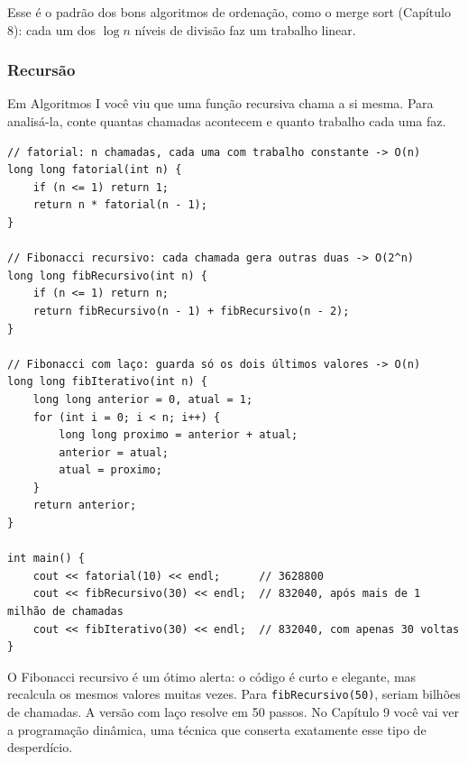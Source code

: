 Esse é o padrão dos bons algoritmos de ordenação, como o merge sort (Capítulo 8): cada um dos $\log n$ níveis de divisão faz um trabalho linear.

\subsubsection{Recursão}

Em Algoritmos I você viu que uma função recursiva chama a si mesma. Para analisá-la, conte quantas chamadas acontecem e quanto trabalho cada uma faz.

\begin{codigo}
\begin{Verbatim}[breaklines=true, breaksymbolleft={}, fontsize=\footnotesize]
// fatorial: n chamadas, cada uma com trabalho constante -> O(n)
long long fatorial(int n) {
    if (n <= 1) return 1;
    return n * fatorial(n - 1);
}

// Fibonacci recursivo: cada chamada gera outras duas -> O(2^n)
long long fibRecursivo(int n) {
    if (n <= 1) return n;
    return fibRecursivo(n - 1) + fibRecursivo(n - 2);
}

// Fibonacci com laço: guarda só os dois últimos valores -> O(n)
long long fibIterativo(int n) {
    long long anterior = 0, atual = 1;
    for (int i = 0; i < n; i++) {
        long long proximo = anterior + atual;
        anterior = atual;
        atual = proximo;
    }
    return anterior;
}

int main() {
    cout << fatorial(10) << endl;      // 3628800
    cout << fibRecursivo(30) << endl;  // 832040, após mais de 1 milhão de chamadas
    cout << fibIterativo(30) << endl;  // 832040, com apenas 30 voltas
}
\end{Verbatim}
\end{codigo}

O Fibonacci recursivo é um ótimo alerta: o código é curto e elegante, mas recalcula os mesmos valores muitas vezes. Para \texttt{fibRecursivo(50)}, seriam bilhões de chamadas. A versão com laço resolve em 50 passos. No Capítulo 9 você vai ver a programação dinâmica, uma técnica que conserta exatamente esse tipo de desperdício.

